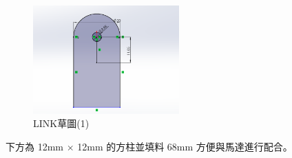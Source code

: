 \begin{figure}[htbp]
    \centering
    \includegraphics[width=0.5\textwidth]{./../images/6-1-41}
    \caption{LINK草圖(1)}
\end{figure}

下方為 12mm $\times$ 12mm 的方柱並填料 68mm 方便與馬達進行配合。

